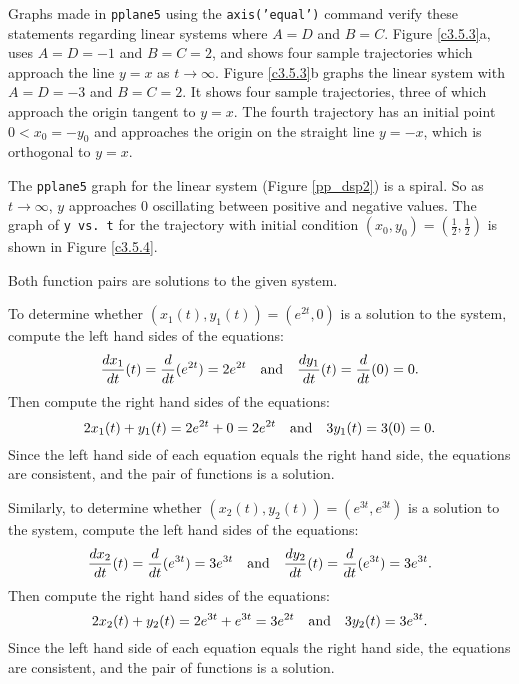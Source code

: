 \documentclass{ximera}
\begin{document}
Graphs made in {\tt pplane5} using the {\tt axis('equal')} command
verify these statements regarding linear systems where $A = D$
and $B = C$.  Figure \ref{c3.5.3}a, uses $A = D = -1$ and
$B = C = 2$, and shows four sample trajectories which approach
the line $y = x$ as $t \rightarrow \infty$.  Figure
\ref{c3.5.3}b graphs the linear system with $A = D = -3$
and $B = C = 2$.  It shows four sample trajectories, three of
which approach the origin tangent to $y = x$.  The fourth
trajectory has an initial point $0 < x_0 = -y_0$ and approaches
the origin on the straight line $y = -x$, which is orthogonal
to $y = x$.
\begin{figure}[htb]
                       \centerline{%
                       }
\end{figure}

The {\tt pplane5} graph for the linear system (Figure \ref{pp_dsp2}) is
a spiral.  So as $t \rightarrow \infty$, $y$ approaches $0$ oscillating
between positive and negative values.  The graph of {\tt y vs.\ t} for the
trajectory with initial condition $(x_0,y_0) = \left(\frac{1}{2},
\frac{1}{2}\right)$ is shown in Figure \ref{c3.5.4}.

\begin{figure}[htb]
                       \centerline{%
                       }
\end{figure}

 \ans Both function pairs are solutions to the given system.

\soln To determine whether $(x_1(t),y_1(t)) = (e^{2t},0)$ is
a solution to the system, compute the left hand sides of the equations:
\[
\frac{dx_1}{dt}(t) = \frac{d}{dt}(e^{2t}) = 2e^{2t} \quad\mbox{and}\quad
\frac{dy_1}{dt}(t) = \frac{d}{dt}(0) = 0.
\]
Then compute the right hand sides of the equations:
\[
2x_1(t) + y_1(t) = 2e^{2t} + 0 = 2e^{2t} \quad\mbox{and}\quad
3y_1(t) = 3(0) = 0.
\]
Since the left hand side of each equation equals the right hand side, the
equations are consistent, and the pair of functions is a solution.

\para Similarly, to determine whether $(x_2(t),y_2(t)) = (e^{3t},e^{3t})$
is a solution to the system, compute the left hand sides of the equations:
\[
\frac{dx_2}{dt}(t) = \frac{d}{dt}(e^{3t}) = 3e^{3t} \quad\mbox{and}\quad
\frac{dy_2}{dt}(t) = \frac{d}{dt}(e^{3t}) = 3e^{3t}.
\]
Then compute the right hand sides of the equations:
\[
2x_2(t) + y_2(t) = 2e^{3t} + e^{3t} = 3e^{2t} \quad\mbox{and}\quad
3y_2(t) = 3e^{3t}.
\]
Since the left hand side of each equation equals the right hand side, the
equations are consistent, and the pair of functions is a solution.
\end{document}
